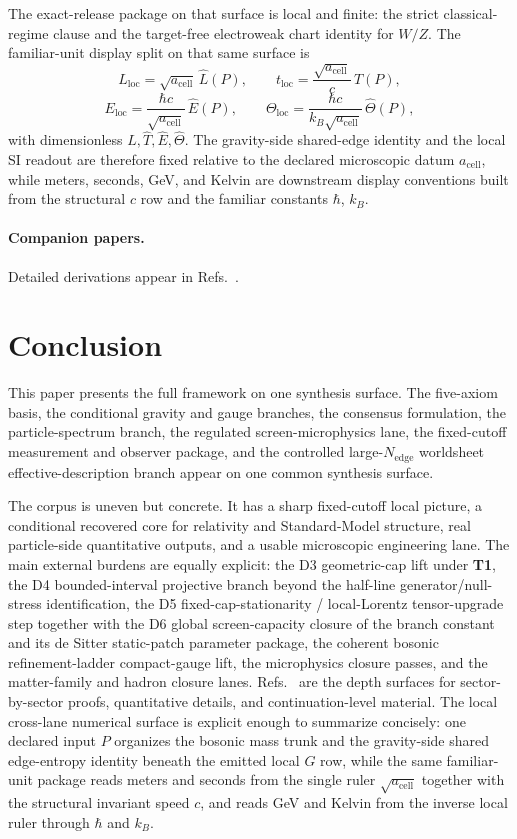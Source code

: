 The exact-release package on that surface is local and finite: the strict classical-regime clause
and the target-free electroweak chart identity for \(W/Z\).
The familiar-unit display split on that same surface is
\[
L_{\mathrm{loc}}=\sqrt{a_{\mathrm{cell}}}\,\widehat L(P),\qquad
t_{\mathrm{loc}}=\frac{\sqrt{a_{\mathrm{cell}}}}{c}\,\widehat T(P),
\]
\[
E_{\mathrm{loc}}=\frac{\hbar c}{\sqrt{a_{\mathrm{cell}}}}\,\widehat E(P),\qquad
\Theta_{\mathrm{loc}}=\frac{\hbar c}{k_B\sqrt{a_{\mathrm{cell}}}}\,\widehat\Theta(P),
\]
with dimensionless \(\widehat L,\widehat T,\widehat E,\widehat\Theta\). The gravity-side
shared-edge identity and the local SI readout are therefore fixed relative to the declared
microscopic datum \(a_{\mathrm{cell}}\), while meters, seconds, GeV, and Kelvin are downstream
display conventions built from the structural \(c\) row and the familiar constants \(\hbar\),
\(k_B\).

\paragraph{Companion papers.}
Detailed derivations appear in Refs.~\cite{ophcompact,ophconsensus,ophmicrophysics,ophparticles}.

\section{Conclusion}

This paper presents the full framework on one synthesis surface. The five-axiom basis, the
conditional gravity and gauge branches, the consensus formulation, the particle-spectrum branch,
the regulated screen-microphysics lane, the fixed-cutoff measurement and observer package, and the
controlled large-\(N_{\mathrm{edge}}\) worldsheet effective-description branch appear on one
common synthesis surface.

The corpus is uneven but concrete. It has a sharp
fixed-cutoff local picture, a conditional recovered core for relativity and Standard-Model
structure, real particle-side quantitative outputs, and a usable microscopic engineering lane. The
main external burdens are equally explicit: the D3 geometric-cap lift under \textbf{T1}, the D4
bounded-interval projective branch beyond the half-line generator/null-stress
identification, the D5
fixed-cap-stationarity / local-Lorentz tensor-upgrade step together with the D6 global
screen-capacity closure of the branch constant and its de Sitter static-patch parameter
package, the coherent bosonic refinement-ladder compact-gauge
lift, the microphysics closure passes, and the matter-family and hadron closure lanes.
Refs.~\cite{ophcompact,ophconsensus,ophmicrophysics,ophparticles} are the depth surfaces for
sector-by-sector proofs, quantitative details, and continuation-level material. The local
cross-lane numerical surface is explicit enough to summarize concisely: one declared input \(P\)
organizes the bosonic mass trunk and the gravity-side shared edge-entropy identity beneath the
emitted local \(G\) row, while the same familiar-unit package reads meters and seconds from the
single ruler \(\sqrt{a_{\mathrm{cell}}}\) together with the structural invariant speed \(c\), and
reads GeV and Kelvin from the inverse local ruler through \(\hbar\) and \(k_B\).
